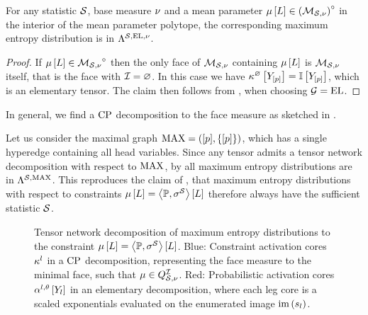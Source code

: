 \begin{theorem}
    For any statistic $\mathcal{S}$, base measure $\nu$ and a mean parameter $\mu\left[L\right]\in{\left(\mathcal{M}_{\mathcal{S},\nu}\right)}^{\circ}$ in the interior of the mean parameter polytope, the corresponding maximum entropy distribution is in $\Lambda^{\mathcal{S},\mathrm{EL},\nu}$.
\end{theorem}
\begin{proof}
    If $\mu\left[L\right]\in{\mathcal{M}_{\mathcal{S},\nu}}^{\circ}$ then the only face of $\mathcal{M}_{\mathcal{S},\nu}$ containing $\mu\left[L\right]$ is $\mathcal{M}_{\mathcal{S},\nu}$ itself, that is the face with $\mathcal{I}=\varnothing$.
    In this case we have $\kappa^{\varnothing}\left[Y_{[p]}\right]=\mathbb{I}\left[Y_{[p]}\right]$, which is an elementary tensor.
    The claim then follows from , when choosing $\mathcal{G}=\mathrm{EL}$.
\end{proof}

In general, we find a $\mathrm{CP}$ decomposition to the face measure as sketched in .

\begin{example}
    Let us consider the maximal graph $\mathrm{MAX}=([p],\{[p]\})$, which has a single hyperedge containing all head variables.
    Since any tensor admits a tensor network decomposition with respect to $\mathrm{MAX}$, by  all maximum entropy distributions are in $\Lambda^{\mathcal{S},\mathrm{MAX}}$.
    This reproduces the claim of , that maximum entropy distributions with respect to constraints $\mu\left[L\right]=\left\langle \mathbb{P},\sigma^{\mathcal{S}}\right\rangle \left[ L \right]$ therefore always have the sufficient statistic $\mathcal{S}$.
\end{example}

\begin{figure}[t]
    \begin{center}
        
    \end{center}
    \caption{
        Tensor network decomposition of maximum entropy distributions to the constraint $\mu\left[L\right]=\left\langle \mathbb{P},\sigma^{\mathcal{S}}\right\rangle \left[ L \right]$.
        Blue: Constraint activation cores $\kappa^{l}$ in a $\mathrm{CP}$ decomposition, representing the face measure to the minimal face, such that $\mu\in Q^{\mathcal{I}}_{\mathcal{S},\nu}$.
        Red: Probabilistic activation cores $\alpha^{l,\theta}\left[Y_{l}\right]$ in an elementary decomposition, where each leg core is a scaled exponentials evaluated on the enumerated image $\mathrm{im}\left(s_{l}\right)$.
    }\label{fig:maxEntropyActcore}
\end{figure}



